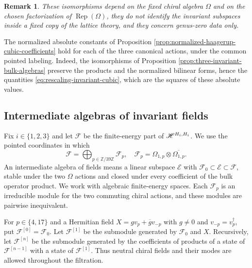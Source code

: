 \documentclass[leqno]{article}
\let\cal\relax
\newcommand{\cal}{\mathcal}
\newcommand{\Z}{\ensuremath{\mathbb{Z}}}
\newcommand{\ot}{\otimes}
\DeclareMathOperator{\Rep}{Rep}
\newtheorem{remark}[thm]{Remark}
\numberwithin{equation}{section}
\begin{document}
\begin{remark}\normalfont
These isomorphisms depend on the fixed chiral algebra $\Omega$ and on the chosen factorization of $\Rep(\Omega)$, they do not identify the invariant subspaces inside a fixed copy of the lattice theory, and they concern genus-zero data only.
\end{remark}

The normalized absolute constants of Proposition \ref{prop:normalized-haagerup-cubic-coefficients} hold for each of the three canonical actions, under the common pointed labeling. Indeed, the isomorphisms of Proposition \ref{prop:three-invariant-bulk-algebras} preserve the products and the normalized bilinear forms, hence the quantities \eqref{eq:rescaling-invariant-cubic}, which are the squares of these absolute values.
\subsection{Intermediate algebras of invariant fields}
\label{subsec:invariant-intermediate-bulk-algebras}

Fix $i \in \{1,2,3\}$ and let $\mathscr F$ be the finite-energy part of $\mathscr H^{\cal H_i,\cal H_i}$. We use the pointed coordinates in which
\begin{equation}
\label{eq:invariant-bulk-pointed-components}
\mathscr F = \bigoplus_{p \in \Z/39\Z}\mathscr F_p,
\quad \mathscr F_p = \Omega_{1,p}\ot\overline{\Omega_{1,p}}.
\end{equation}
An intermediate algebra of fields means a linear subspace $\mathscr E$ with $\mathscr F_0 \subset \mathscr E \subset \mathscr F$, stable under the two $\Omega$ actions and closed under every coefficient of the bulk operator product. We work with algebraic finite-energy spaces. Each $\mathscr F_p$ is an irreducible module for the two commuting chiral actions, and these modules are pairwise inequivalent.

For $p \in \{4,17\}$ and a Hermitian field $X = gv_p+\overline gv_{-p}$ with $g \neq 0$ and $v_{-p} = v_p^\dagger$, put $\mathscr F^{[0]} = \mathscr F_0$. Let $\mathscr F^{[1]}$ be the submodule generated by $\mathscr F_0$ and $X$. Recursively, let $\mathscr F^{[n]}$ be the submodule generated by the coefficients of products of a state of $\mathscr F^{[n-1]}$ with a state of $\mathscr F^{[1]}$. Thus neutral chiral fields and their modes are allowed throughout the filtration.
\end{document}
